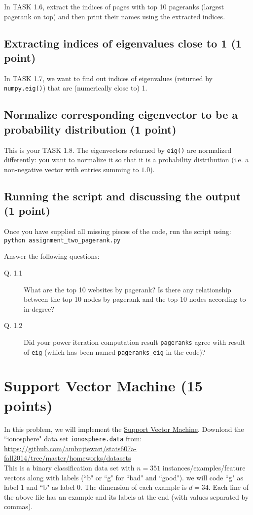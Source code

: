 \documentclass{article}
\begin{document}
In TASK 1.6, extract the indices of pages with top 10 pageranks (largest pagerank on top) and then print their names using the extracted indices.

\subsection{Extracting indices of eigenvalues close to 1 (1 point)}

In TASK 1.7, we want to find out indices of eigenvalues (returned by {\tt numpy.eig()}) that are (numerically close to) 1.

\subsection{Normalize corresponding eigenvector to be a probability distribution (1 point)}

This is your TASK 1.8. The eigenvectors returned by {\tt eig()} are normalized differently: you want to normalize it so that it is a probability distribution (i.e.
a non-negative vector with entries summing to $1.0$).

\subsection{Running the script and discussing the output (1 point)}

Once you have supplied all missing pieces of the code, run the script using:\\
{\tt python assignment\_two\_pagerank.py}

Answer the following questions:
\begin{description}
\item[Q. 1.1]
What are the top 10 websites by pagerank? Is there any relationship between the top 10 nodes by pagerank and the top 10 nodes according to in-degree?
\item[Q. 1.2]
Did your power iteration computation result {\tt pageranks} agree with result of {\tt eig} (which has been named {\tt pageranks\_eig} in the code)?
\end{description}


\section{Support Vector Machine (15 points)}


In this problem, we will implement the \href{http://en.wikipedia.org/wiki/Support\_vector\_machine}{Support Vector Machine}.
Download the ``ionosphere" data set {\tt ionosphere.data} from:\\
\url{https://github.com/ambujtewari/stats607a-fall2014/tree/master/homeworks/datasets} \\
This is a binary classification data set with $n=351$ instances/examples/feature vectors along with labels (``b" or ``g" for ``bad" and ``good"). we will code ``g"
as label $1$ and ``b" as label $0$.
The dimension of each example is $d=34$. Each line of the above file has an example and its labels at the end (with values separated by commas).
\end{document}
